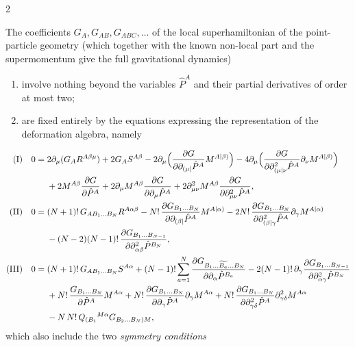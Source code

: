 \begin{paracol}{2}
\begin{theorem}\label{thm:c29-pde}
The coefficients $G_A,G_{AB},G_{ABC},\dots$ of the local superhamiltonian of the point-particle geometry (which together with the known non-local part and the supermomentum give the full gravitational dynamics)
\begin{enumerate}
  \item[(a)] involve nothing beyond the variables $\hat P^A$ and their partial derivatives of order at most two;
  \item[(b)] are fixed entirely by the equations expressing the representation of the deformation algebra, namely
\end{enumerate}
\begin{align*}
\text{(I)}\quad 0={}&2\partial_\mu(G_AR^{A\beta\mu})+2G_AS^{A\beta}-2\partial_\mu\Bigl(\frac{\partial G}{\partial\partial_{(\mu|}\hat P^A}M^{A|\beta)}\Bigr)-4\partial_\mu\Bigl(\frac{\partial G}{\partial\partial^2_{(\mu|\nu}\hat P^A}\partial_\nu M^{A|\beta)}\Bigr)\\
&+2M^{A\beta}\frac{\partial G}{\partial\hat P^A}+2\partial_\mu M^{A\beta}\frac{\partial G}{\partial\partial_\mu\hat P^A}+2\partial^2_{\mu\nu}M^{A\beta}\frac{\partial G}{\partial\partial^2_{\mu\nu}\hat P^A},\\
\text{(II)}\quad 0={}&(N+1)!\,G_{AB_1\dots B_N}R^{A\alpha\beta}-N!\,\frac{\partial G_{B_1\dots B_N}}{\partial\partial_{(\beta|}\hat P^A}M^{A|\alpha)}-2N!\,\frac{\partial G_{B_1\dots B_N}}{\partial\partial^2_{(\beta|\gamma}\hat P^A}\partial_\gamma M^{A|\alpha)}\\
&-(N-2)(N-1)!\,\frac{\partial G_{B_1\dots B_{N-1}}}{\partial\partial^2_{\alpha\beta}\hat P^{B_N}},\\
\text{(III)}\quad 0={}&(N+1)!\,G_{AB_1\dots B_N}S^{A\alpha}+(N-1)!\sum_{a=1}^N\frac{\partial G_{B_1\dots\widetilde{B_a}\dots B_N}}{\partial\partial_\alpha\hat P^{B_a}}-2(N-1)!\,\partial_\gamma\frac{\partial G_{B_1\dots B_{N-1}}}{\partial\partial^2_{\alpha\gamma}\hat P^{B_N}}\\
&+N!\,\frac{G_{B_1\dots B_N}}{\partial\hat P^A}M^{A\alpha}+N!\,\frac{\partial G_{B_1\dots B_N}}{\partial\partial_\gamma\hat P^A}\partial_\gamma M^{A\alpha}+N!\,\frac{\partial G_{B_1\dots B_N}}{\partial\partial^2_{\gamma\delta}\hat P^A}\partial^2_{\gamma\delta}M^{A\alpha}\\
&-N\,N!\,Q_{(B_1}{}^{M\alpha}G_{B_2\dots B_N)M},
\end{align*}
which also include the two \emph{symmetry conditions}

\end{theorem}
\end{paracol}
